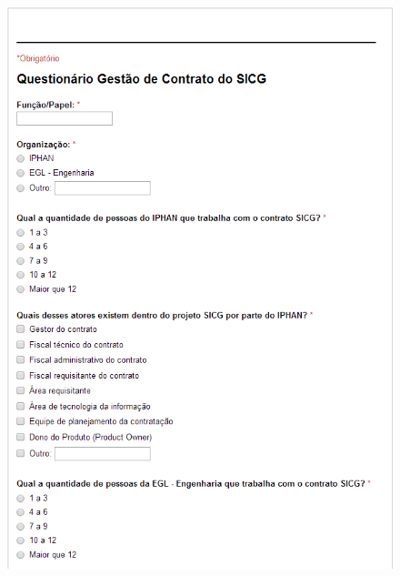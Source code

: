 \begin{apendicesenv}
\begin{figure}[H]
		\centering
			\includegraphics[scale=1.0]{figuras/quest2.png}

		\label{quest2}
\end{figure}


\end{apendicesenv}
